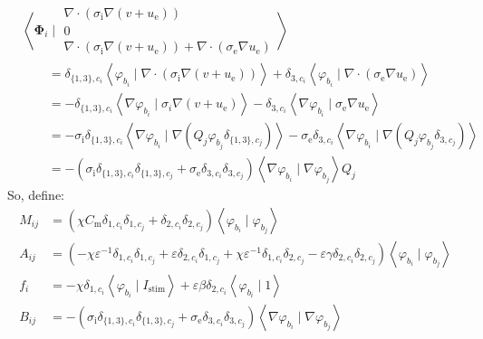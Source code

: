\documentclass{article}
\newcommand{\bvec}[1]{\boldsymbol{#1}}
\begin{document}
\begin{align*}
    & \left< \bvec{\Phi}_i \mid \begin{matrix}
            \nabla \cdot (\sigma_\text{i} \nabla (v + u_\text{e})) \\
            0 \\
            \nabla \cdot (\sigma_\text{i} \nabla (v + u_\text{e}))
                + \nabla \cdot (\sigma_\text{e} \nabla u_\text{e})
        \end{matrix} \right> \\
    & \qquad = \delta_{\{1,3\}, c_i} \left< \varphi_{b_i} \mid \nabla \cdot (\sigma_\text{i} \nabla (v + u_\text{e})) \right>
        + \delta_{3, c_i} \left< \varphi_{b_i} \mid \nabla \cdot (\sigma_\text{e} \nabla u_\text{e}) \right> \\
    & \qquad = -\delta_{\{1,3\}, c_i} \left< \nabla \varphi_{b_i} \mid \sigma_i \nabla (v + u_\text{e}) \right>
        - \delta_{3, c_i} \left< \nabla \varphi_{b_i} \mid \sigma_\text{e} \nabla u_\text{e} \right> \\
    & \qquad = -\sigma_\text{i} \delta_{\{1,3\}, c_i}
            \left< \nabla \varphi_{b_i} \mid \nabla (Q_j \varphi_{b_j} \delta_{\{1,3\}, c_j}) \right>
        - \sigma_\text{e} \delta_{3, c_i} \left< \nabla \varphi_{b_i} \mid \nabla (Q_j \varphi_{b_j} \delta_{3, c_j}) \right> \\
    & \qquad = -(\sigma_\text{i} \delta_{\{1,3\}, c_i} \delta_{\{1,3\}, c_j} + \sigma_\text{e} \delta_{3, c_i} \delta_{3, c_j})
            \left< \nabla \varphi_{b_i} \mid \nabla \varphi_{b_j} \right> Q_j
\end{align*}
\noindent So, define:
\begin{align*}
    M_{ij} & = (\chi C_\text{m} \delta_{1, c_i} \delta_{1,c_j} + \delta_{2, c_i} \delta_{2, c_j})
        \left< \varphi_{b_i} \mid \varphi_{b_j} \right> \\
    A_{ij} & = (-\chi \varepsilon^{-1} \delta_{1, c_i} \delta_{1, c_j} + \varepsilon \delta_{2, c_i} \delta_{1, c_j}
            + \chi \varepsilon^{-1} \delta_{1, c_i} \delta_{2, c_j} - \varepsilon \gamma \delta_{2, c_i} \delta_{2, c_j})
        \left< \varphi_{b_i} \mid \varphi_{b_j} \right> \\
    f_i & = -\chi \delta_{1, c_i} \left< \varphi_{b_i} \mid I_\text{stim} \right>
        + \varepsilon \beta \delta_{2, c_i} \left< \varphi_{b_i} \mid 1 \right> \\
    B_{ij} & = -(\sigma_\text{i} \delta_{\{1,3\}, c_i} \delta_{\{1,3\}, c_j} + \sigma_\text{e} \delta_{3, c_i} \delta_{3, c_j})
        \left< \nabla \varphi_{b_i} \mid \nabla \varphi_{b_j} \right>
\end{align*}
\end{document}
